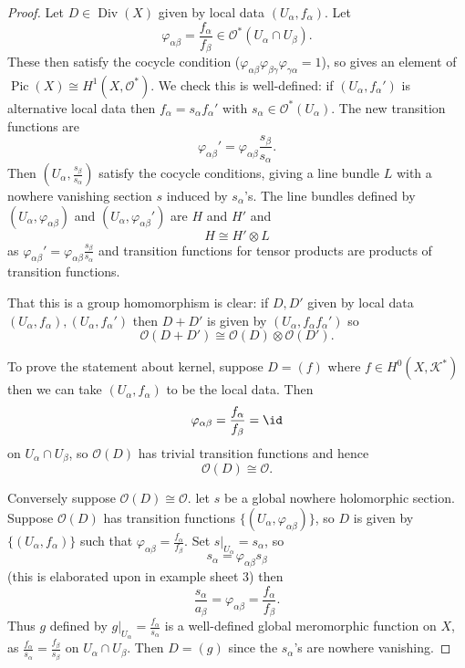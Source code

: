 \documentclass[a4paper]{article}
\DeclareMathOperator{\Pic}{Pic} %
\DeclareMathOperator{\Div}{Div} %
\begin{document}
\begin{proof}
  Let \(D \in \Div(X)\) given by local data \((U_\alpha, f_\alpha)\). Let
  \[
    \varphi_{\alpha\beta} = \frac{f_\alpha}{f_\beta} \in \mathcal O^*(U_\alpha \cap U_\beta).
  \]
  These then satisfy the cocycle condition (\(\varphi_{\alpha\beta} \varphi_{\beta\gamma} \varphi_{\gamma\alpha} = 1\)), so gives an element of \(\Pic (X) \cong H^1(X, \mathcal O^*)\). We check this is well-defined: if \((U_\alpha, f_\alpha')\) is alternative local data then \(f_\alpha = s_\alpha f_\alpha'\) with \(s_\alpha \in \mathcal O^*(U_\alpha)\). The new transition functions are
  \[
    \varphi_{\alpha\beta}' = \varphi_{\alpha\beta} \frac{s_\beta}{s_\alpha}.
  \]
  Then \((U_\alpha, \frac{s_\beta}{s_\alpha})\) satisfy the cocycle conditions, giving a line bundle \(L\) with a nowhere vanishing section \(s\) induced by \(s_\alpha\)'s. The line bundles defined by \((U_\alpha, \varphi_{\alpha\beta})\) and \((U_\alpha, \varphi_{\alpha\beta}')\) are \(H\) and \(H'\) and
  \[
    H \cong H' \otimes L
  \]
  as \(\varphi_{\alpha\beta}' = \varphi_{\alpha\beta} \frac{s_\beta}{s_\alpha}\) and transition functions for tensor products are products of transition functions.

  That this is a group homomorphism is clear: if \(D, D'\) given by local data \((U_\alpha, f_\alpha), (U_\alpha, f_\alpha')\) then \(D + D'\) is given by \((U_\alpha, f_\alpha f_\alpha')\) so
  \[
    \mathcal O(D + D') \cong \mathcal O(D) \otimes \mathcal O(D').
  \]

  To prove the statement about kernel, suppose \(D = (f)\) where \(f \in H^0(X, \mathcal K^*)\) then we can take \((U_\alpha, f_\alpha)\) to be the local data. Then
  \[
    \varphi_{\alpha\beta} = \frac{f_\alpha}{f_\beta} = \id
  \]
  on \(U_\alpha \cap U_\beta\), so \(\mathcal O(D)\) has trivial transition functions and hence
  \[
    \mathcal O(D) \cong \mathcal O.
  \]

  Conversely suppose \(\mathcal O(D) \cong \mathcal O\). let \(s\) be a global nowhere holomorphic section. Suppose \(\mathcal O(D)\) has transition functions \(\{(U_\alpha, \varphi_{\alpha\beta})\}\), so \(D\) is given by \(\{(U_\alpha, f_\alpha)\}\) such that \(\varphi_{\alpha\beta} = \frac{f_\alpha}{f_\beta}\). Set \(s|_{U_\alpha} = s_\alpha\), so
  \[
    s_\alpha = \varphi_{\alpha\beta} s_\beta
  \]
  (this is elaborated upon in example sheet 3) then
  \[
    \frac{s_\alpha}{a_\beta} = \varphi_{\alpha\beta} = \frac{f_\alpha}{f_\beta}.
  \]
  Thus \(g\) defined by \(g|_{U_\alpha} = \frac{f_\alpha}{s_\alpha}\) is a well-defined global meromorphic function on \(X\), as \(\frac{f_\alpha}{s_\alpha} = \frac{f_\beta}{s_\beta}\) on \(U_\alpha \cap U_\beta\). Then \(D = (g)\) since the \(s_\alpha\)'s are nowhere vanishing.
\end{proof}
\end{document}
